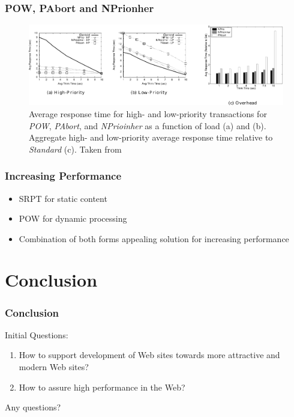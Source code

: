 \documentclass[9pt]{beamer}
\begin{document}
\begin{frame}
\frametitle<presentation>{POW, PAbort and NPrionher}

  \begin{figure}[h]
    \centerline{\includegraphics[width=12cm]{pics/pow.pdf}}
    \caption{Average response time for high- and low-priority transactions for \textit{POW}, \textit{PAbort}, and \textit{NPrioinher} as a function of load (a) and (b). Aggregate high- and low-priority average response time
    relative to \textit{Standard} (c). Taken from \cite{McWherter}
    }
    \label{fig-pow}
  \end{figure}

\end{frame}

\begin{frame}
\frametitle<presentation>{Increasing Performance}
  \begin{itemize}
    \item SRPT for static content
    \item POW for dynamic processing
    \item Combination of both forms appealing solution for increasing performance
  \end{itemize}
\end{frame}

\section{Conclusion}
\begin{frame}
\frametitle<presentation>{Conclusion}
  Initial Questions:
  
  \begin{enumerate}
  \item How to support development of Web sites towards more attractive and modern Web sites?
  \item How to assure high performance in the Web?
  \end{enumerate}

\end{frame}

\begin{frame}
  \begin{center}
    \huge{Any questions?}
  \end{center}
\end{frame}


\end{document}
